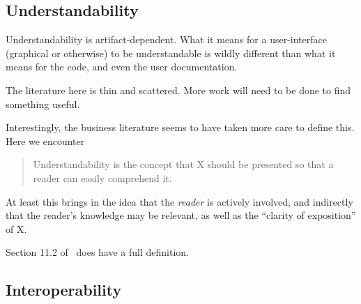 \documentclass[letterpaper,cleveref]{lipics-v2019}
\theoremstyle{definition}
\begin{document}
 

\subsection{Understandability}

Understandability is artifact-dependent. What it means for a user-interface (graphical
or otherwise) to be understandable is wildly different than what it means for the code,
and even the user documentation.

The literature here is thin and scattered.  More work will need to be done to find
something useful.

Interestingly, the business literature seems to have taken more care to define this.
Here we encounter
\begin{quote}
Understandability is the concept that X should be presented
so that a reader can easily comprehend it.
\end{quote}
At least this brings in the idea that the \emph{reader} is actively involved, and
indirectly that the reader's knowledge may be relevant, as well as the
``clarity of exposition'' of X.

Section 11.2 of~\cite{adams2015nonfunctional} does have a full definition.

\subsection{Interoperability}
\end{document}
